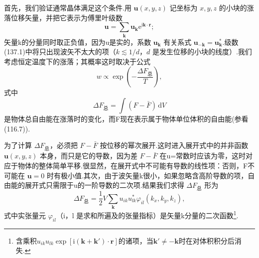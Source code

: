 首先，我们验证通常晶体满足这个条件.用 $\boldsymbol{u}(x,y,z)$ 记坐标为 $x,y,z$ 的小块的涨落位移矢量，并把它表示为傅里叶级数
\begin{equation}
  \boldsymbol{u}=\sum_{\boldsymbol{k}}\boldsymbol{u}_{\boldsymbol{k}}
  \mathrm{e}^{\mathrm{i}\boldsymbol{k}\cdot\boldsymbol{r}};
\end{equation}
矢量k的分量同时取正负值，因为u是实的，系数 $\boldsymbol{u}_{\boldsymbol{k}}$ 有关系式 $\boldsymbol{u}_{-\boldsymbol{k}}=\boldsymbol{u}_{\boldsymbol{k}}^{*}$.级数(137.1)中将只出现波矢不太大的项（$k\lesssim1/d$，$d$ 是发生位移的小块的线度）.我们考虑恒定温度下的涨落；其概率这时取决于公式
\begin{equation}
  w\propto\exp\left(-\frac{\Delta F_{\text{总}}}{T}\right),
\end{equation}
式中
\begin{equation}
  \Delta F_{\text{总}}=\int(F-\bar{F})\,\mathrm{d}V
\end{equation}
是物体总自由能在涨落时的变化，而F现在表示属于物体单位体积的自由能(参看(116.7)).

为了计算 $\Delta F_{\text{总}}$，必须把 $F-\bar{F}$ 按位移的幂次展开.这时进入展开式中的并非函数 $\boldsymbol{u}(x,y,z)$ 本身，而只是它的导数，因为差 $F-\bar{F}$ 在u=常数时应该为零，这时对应于物体的整体简单平移.很显然，在展开式中不可能有导数的线性项：否则，F不可能在 $\boldsymbol{u}=0$ 时有极小值.其次，由于波矢量k很小，如果忽略含高阶导数的项，自由能的展开式只需限于u的一阶导数的二次项.结果我们求得 $\Delta F_{\text{总}}$ 形为
\begin{equation}
  \Delta F_{\text{总}}=\frac{1}{2}V\sum_{\boldsymbol{k}}
  u_{ik}u_{lk}^{*}\varphi_{il}(k_x,k_y,k_z),
\end{equation}
式中实张量元 $\varphi_{il}$（i，l 是求和所遍及的张量指标）是矢量k分量的二次函数\footnote{含乘积$u_{ik}u_{lk}\exp[\mathrm{i}(\boldsymbol{k}+\boldsymbol{k}')\cdot\boldsymbol{r}]$的诸项，当$\boldsymbol{k}'\neq-\boldsymbol{k}$时在对体积积分后消失.}.

